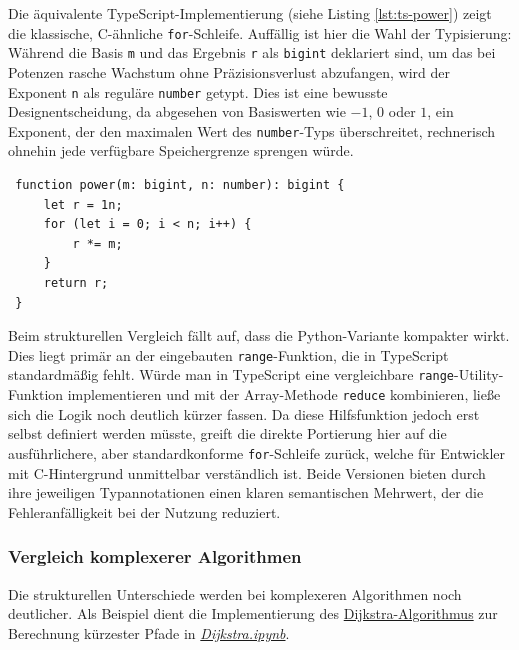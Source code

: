 Die äquivalente TypeScript-Implementierung (siehe Listing \ref{lst:ts-power}) zeigt die klassische, C-ähnliche \texttt{for}-Schleife. Auffällig ist hier die Wahl der Typisierung: Während die Basis \texttt{m} und das Ergebnis \texttt{r} als \texttt{bigint} deklariert sind, um das bei Potenzen rasche Wachstum ohne Präzisionsverlust abzufangen, wird der Exponent \texttt{n} als reguläre \texttt{number} getypt. Dies ist eine bewusste Designentscheidung, da abgesehen von Basiswerten wie $-1$, $0$ oder $1$, ein Exponent, der den maximalen Wert des \texttt{number}-Typs überschreitet, rechnerisch ohnehin jede verfügbare Speichergrenze sprengen würde.
\begin{verbatim}
 function power(m: bigint, n: number): bigint {
     let r = 1n;
     for (let i = 0; i < n; i++) {
         r *= m;
     }
     return r;
 }
\end{verbatim}
\label{lst:ts-power}

Beim strukturellen Vergleich fällt auf, dass die Python-Variante kompakter wirkt. Dies liegt primär an der eingebauten \texttt{range}-Funktion, die in TypeScript standardmäßig fehlt. Würde man in TypeScript eine vergleichbare \texttt{range}-Utility-Funktion implementieren und mit der Array-Methode \texttt{reduce} kombinieren, ließe sich die Logik noch deutlich kürzer fassen. Da diese Hilfsfunktion jedoch erst selbst definiert werden müsste, greift die direkte Portierung hier auf die ausführlichere, aber standardkonforme \texttt{for}-Schleife zurück, welche für Entwickler mit C-Hintergrund unmittelbar verständlich ist. Beide Versionen bieten durch ihre jeweiligen Typannotationen einen klaren semantischen Mehrwert, der die Fehleranfälligkeit bei der Nutzung reduziert.


\subsubsection{Vergleich komplexerer Algorithmen}
Die strukturellen Unterschiede werden bei komplexeren Algorithmen noch deutlicher. Als Beispiel dient die Implementierung des \href{https://de.wikipedia.org/wiki/Dijkstra-Algorithmus}{Dijkstra-Algorithmus} zur Berechnung kürzester Pfade in \href{https://github.com/zLeoll/TS-Translation-for-TheoInf/blob/main/Algorithms/Chapter-11/Dijkstra.ipynb}{\textit{Dijkstra.ipynb}}.

